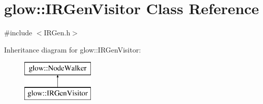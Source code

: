 \hypertarget{classglow_1_1_i_r_gen_visitor}{}\section{glow\+:\+:I\+R\+Gen\+Visitor Class Reference}
\label{classglow_1_1_i_r_gen_visitor}


{\ttfamily \#include $<$I\+R\+Gen.\+h$>$}

Inheritance diagram for glow\+:\+:I\+R\+Gen\+Visitor\+:\begin{figure}[H]
\begin{center}
\leavevmode
\includegraphics[height=2.000000cm]{classglow_1_1_i_r_gen_visitor}
\end{center}
\end{figure}
